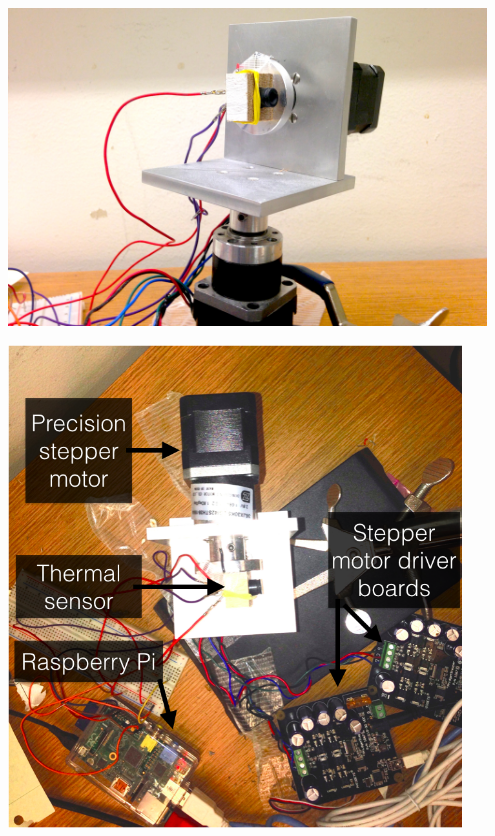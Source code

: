 \documentclass[landscape,final,a0paper,fontscale=0.33]{baposter}
\begin{document}
\begin{poster}
{{\begin{minipage}{0.48\textwidth}
\includegraphics[width=0.95\textwidth]{figures/hardware_real}
\label{cam}%
\end{minipage} \hspace{1em}
\begin{minipage}{0.45\textwidth}
\includegraphics[width=0.9\textwidth]{figures/hardware-text}
\hspace{-1em}\label{hw}
\end{minipage}
\vspace{0.3em}

}}
\end{poster}
\end{document}
